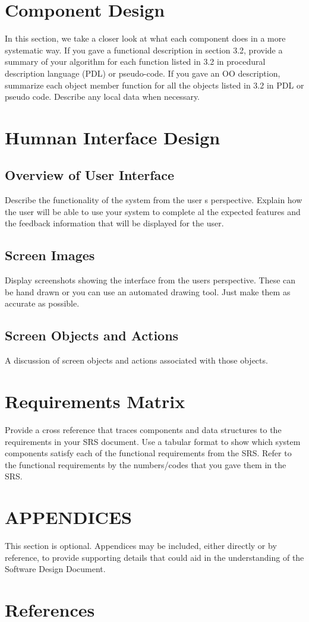 \documentclass[12pt]{article}
\begin{document}
\section{Component Design}
In this section, we take a closer look at what each component does in a more systematic way. If you gave a functional description in section 3.2, provide a summary of your algorithm for each 
function listed in 3.2 in procedural description language (PDL) or pseudo-code. If you gave an 
OO description, summarize each object member function for all the objects listed in 3.2 in PDL
or pseudo code. Describe any local data when necessary.


\section{Humnan Interface Design}

\subsection {Overview of User Interface}
Describe the functionality of the system from the user s perspective. Explain  how the user 
will be  able  to use  your system to complete  al the  expected  features and  the  feedback 
information that will be displayed for the user.

\subsection {Screen Images}
Display screenshots showing the interface from the users perspective. These can be  hand drawn
or you can use an automated drawing tool. Just make them as accurate as possible.



\subsection {Screen Objects and Actions}
A discussion of screen objects and actions associated with those objects.


\section{Requirements Matrix}
Provide a cross reference that traces components and data structures to the requirements in your
SRS document.
Use  a  tabular  format to show  which system  components satisfy each of the  functional 
requirements from the SRS. Refer to the functional requirements by the numbers/codes that you 
gave them in the SRS.


\section{APPENDICES}
This section is optional.
Appendices may be included, either directly or by reference, to provide supporting details that could 
aid in the understanding of the Software Design Document.

\section {References}



\end{document}
